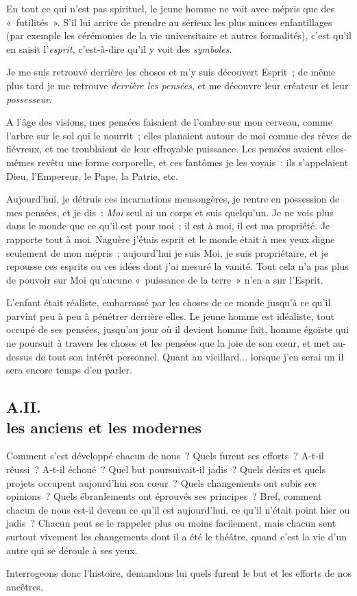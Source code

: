 \documentclass[french,twoside]{book} %
\begin{document}
En tout ce qui n’est pas spirituel, le jeune homme ne voit avec mépris que des « futilités ». S’il lui arrive de prendre au sérieux les plus minces enfantillages (par exemple les cérémonies de la vie universitaire et autres formalités), c’est qu’il en saisit l’\emph{esprit,} c’est-à-dire qu’il y voit des \emph{symboles}.\par
Je me suis retrouvé derrière les choses et m’y suis découvert Esprit ; de même plus tard je me retrouve \emph{derrière les pensées}, et me découvre leur créateur et leur \emph{possesseur}.\par
A l’âge des visions, mes pensées faisaient de l’ombre sur mon cerveau, comme l’arbre sur le sol qui le nourrit ; elles planaient autour de moi comme des rêves de fiévreux, et me troublaient de leur effroyable puissance. Les pensées avaient elles-mêmes revêtu une forme corporelle, et ces fantômes je les voyais : ils s’appelaient Dieu, l’Empereur, le Pape, la Patrie, etc.\par
Aujourd’hui, je détruis ces incarnations mensongères, je rentre en possession de mes pensées, et je dis : \emph{Moi} seul ai un corps et suis quelqu’un. Je ne vois plus dans le monde que ce qu’il est pour moi ; il est à moi, il est ma propriété. Je rapporte tout à  moi. Naguère j’étais esprit et le monde était à mes yeux digne seulement de mon mépris ; aujourd’hui je suis Moi, je suis propriétaire, et je repousse ces esprits ou ces idées dont j’ai mesuré la vanité. Tout cela n’a pas plus de pouvoir sur Moi qu’aucune « puissance de la terre » n’en a sur l’Esprit.\par
L’enfant était réaliste, embarrassé par les choses de ce monde jusqu’à ce qu’il parvînt peu à peu à pénétrer derrière elles. Le jeune homme est idéaliste, tout occupé de ses pensées, jusqu’au jour où il devient homme fait, homme égoïste qui ne poursuit à travers les choses et les pensées que la joie de son cœur, et met au-dessus de tout son intérêt personnel. Quant au vieillard... lorsque j’en serai un il sera encore temps d’en parler.
 \subsection[{A.II. les anciens et les modernes}]{A.II. \\
les anciens et les modernes}
\noindent Comment s’est développé chacun de nous ? Quels furent ses efforts ? A-t-il réussi ? A-t-il échoué ? Quel but poursuivait-il jadis ? Quels désirs et quels projets occupent aujourd’hui son cœur ? Quels changements ont subis ses opinions ? Quels ébranlements ont éprouvés ses principes ? Bref, comment chacun de nous est-il devenu ce qu’il est aujourd’hui, ce qu’il n’était point hier ou jadis ? Chacun peut se le rappeler plus ou moins facilement, mais chacun sent surtout vivement les changements dont il a été le théâtre, quand c’est la vie d’un autre qui se déroule à ses yeux.\par
Interrogeons donc l’histoire, demandons lui quels furent le but et les efforts de nos ancêtres.\par
\end{document}
